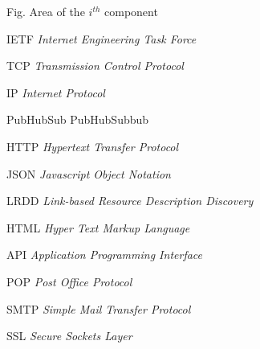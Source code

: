 \begin{siglas}
  \item[Fig.] Area of the $i^{th}$ component
  \item[IETF] \textit{Internet Engineering Task Force}
  \item[TCP] \textit{Transmission Control Protocol}
  \item[IP] \textit{Internet Protocol}
  \item[PubHubSub] PubHubSubbub
  \item[HTTP] \textit{Hypertext Transfer Protocol}
  \item[JSON] \textit{Javascript Object Notation}
  \item[LRDD] \textit{Link-based Resource Description Discovery}
  \item[HTML] \textit{Hyper Text Markup Language}
  \item[API] \textit{Application Programming Interface}
  \item[POP] \textit{Post Office Protocol}
  \item[SMTP] \textit{Simple Mail Transfer Protocol}
  \item[SSL] \textit{Secure Sockets Layer}
\end{siglas}
